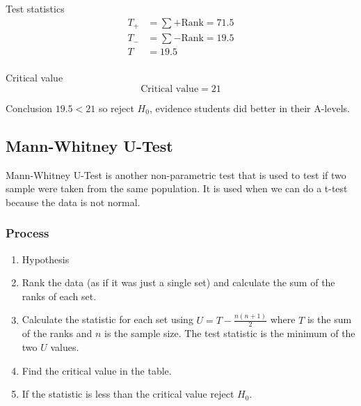 \begin{example}
        \begin{step}{Test statistics}
        \begin{align*}
        T_+ &= \sum{+ \text{Rank}} = 71.5\\
        T_- &= \sum{- \text{Rank}} = 19.5\\
        T &= 19.5\\
        \end{align*}
        \end{step}
        
        \begin{step}{Critical value}
        $$\text{Critical value} = 21$$
        \end{step}
        
        \begin{step}{Conclusion}
        $19.5 < 21$ so reject $H_0$, evidence students did better in their A-levels.
        \end{step}
        \end{example}
        
    \newpage
    \subsection{Mann-Whitney U-Test}
    
        Mann-Whitney U-Test is another non-parametric test that is used to test if two sample were taken from the same population. It is used when we can do a t-test because the data is not normal.
        
        \subsubsection{Process}
            \begin{enumerate}
                \item Hypothesis
                \item Rank the data (as if it was just a single set) and calculate the sum of the ranks of each set.
                \item Calculate the statistic for each set using $U = T - \displaystyle\frac{n(n+1)}{2}$ where $T$ is the sum of the ranks and $n$ is the sample size. The test statistic is the minimum of the two $U$ values.
                \item Find the critical value in the table.
                \item If the statistic is less than the critical value reject $H_0$.
            \end{enumerate}
   
